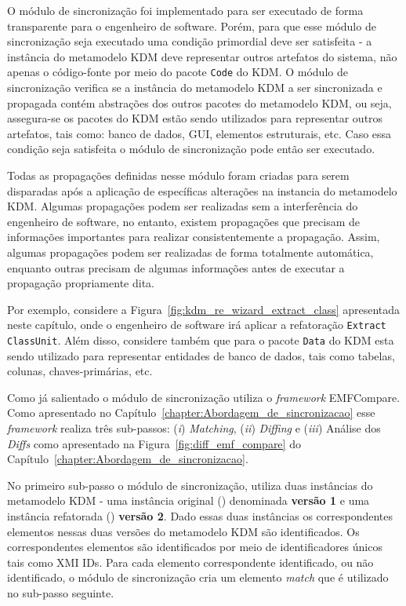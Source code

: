 O módulo de sincronização foi implementado para ser executado de forma transparente para o engenheiro de software. Porém, para que esse módulo de sincronização seja executado uma condição primordial deve ser satisfeita - a instância do metamodelo KDM deve representar outros artefatos do sistema, não apenas o código-fonte por meio do pacote \texttt{Code} do KDM. O módulo de sincronização verifica se a instância do metamodelo KDM a ser sincronizada e propagada contém abstrações dos outros pacotes do metamodelo KDM, ou seja, assegura-se os pacotes do KDM estão sendo utilizados para representar outros artefatos, tais como: banco de dados, GUI, elementos estruturais, etc. Caso essa condição seja satisfeita o módulo de sincronização pode então ser executado.

Todas as propagações definidas nesse módulo foram criadas para serem disparadas após a aplicação de específicas alterações na instancia do metamodelo KDM. Algumas propagações podem ser realizadas sem a interferência do engenheiro de software, no entanto, existem propagações que precisam de informações importantes para realizar consistentemente a propagação. Assim, algumas propagações podem ser realizadas de forma totalmente automática, enquanto outras precisam de algumas informações antes de executar a propagação propriamente dita.

Por exemplo, considere a Figura~\ref{fig:kdm_re_wizard_extract_class} apresentada neste capítulo, onde o engenheiro de software irá aplicar a refatoração \texttt{Extract ClassUnit}. Além disso, considere também que para o pacote \texttt{Data} do KDM esta sendo utilizado para representar entidades de banco de dados, tais como tabelas, colunas, chaves-primárias, etc.

Como já salientado o módulo de sincronização utiliza o \textit{framework} EMFCompare. Como apresentado no Capítulo~\ref{chapter:Abordagem_de_sincronizacao} esse \textit{framework} realiza três sub-passos: (\textit{i}) \textit{Matching}, (\textit{ii}) \textit{Diffing} e (\textit{iii}) Análise dos \textit{Diffs} como apresentado na Figura~\ref{fig:diff_emf_compare} do Capítulo~\ref{chapter:Abordagem_de_sincronizacao}.

No primeiro sub-passo o módulo de sincronização, utiliza duas instâncias do metamodelo KDM - uma instância original () denominada \textbf{versão 1} e uma instância refatorada () \textbf{versão 2}. Dado essas duas instâncias os correspondentes elementos nessas duas versões do metamodelo KDM são identificados. Os correspondentes elementos são identificados por meio de identificadores únicos tais como XMI IDs. Para cada elemento correspondente identificado, ou não identificado, o módulo de sincronização cria um elemento \textit{match} que é utilizado no sub-passo seguinte.

